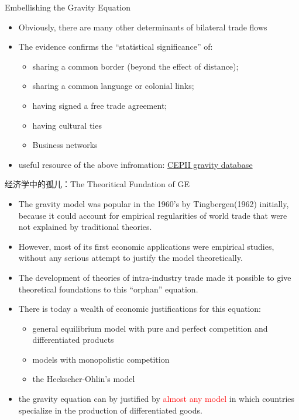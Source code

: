 \documentclass[10pt,hyperref={CJKbookmarks=true},xcolor=dvipsnames,aspectratio=169]{beamer}
\begin{document}
\begin{frame}{Embellishing the Gravity Equation}

\begin{itemize}
\item Obviously, there are many other determinants of bilateral trade flows 
\item The evidence confirms the “statistical significance” of: 

\begin{itemize}
\item sharing a common border (beyond the effect of distance); 
\item sharing a common language or colonial links; 
\item having signed a free trade agreement; 
\item having cultural ties
\item Business networks
\end{itemize}
\item useful resource of the above infromation: \href{http://www.cepii.org}{CEPII gravity database}
\end{itemize}
\end{frame}

\begin{frame}{经济学中的孤儿：The Theoritical Fundation of GE}

\begin{itemize}
\item The gravity model was popular in the 1960’s by Tingbergen(1962) initially,
because it could account for empirical regularities of world trade
that were not explained by traditional theories. 
\item However, most of its first economic applications were empirical studies,
without any serious attempt to justify the model theoretically. 
\item The development of theories of intra-industry trade made it possible
to give theoretical foundations to this “orphan” equation. 
\item There is today a wealth of economic justifications for this equation:

\begin{itemize}
\item general equilibrium model with pure and perfect competition and differentiated
products
\item models with monopolistic competition
\item the Heckscher-Ohlin’s model
\end{itemize}
\item the gravity equation can by justified by \textcolor{red}{almost any
model} in which countries specialize in the production of differentiated
goods.
\end{itemize}
\end{frame}
\end{document}
